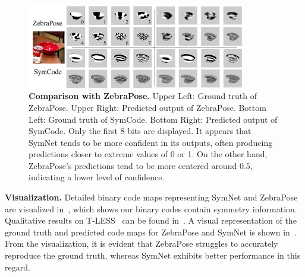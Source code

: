 \begin{figure}[th]
        \centerline{\includegraphics[width=0.85\textwidth]{figure/symnet/compare_with_zebrapose.jpg}}
        \caption{\textbf{Comparison with ZebraPose.} Upper Left: Ground truth of ZebraPose. Upper Right: Predicted output of ZebraPose. Bottom Left: Ground truth of SymCode. Bottom Right: Predicted output of SymCode. Only the first 8 bits are displayed. It appears that SymNet tends to be more confident in its outputs, often producing predictions closer to extreme values of 0 or 1. On the other hand, ZebraPose's predictions tend to be more centered around 0.5, indicating a lower level of confidence.}
        \label{fig:compare_zebrapose}
\end{figure}

\textbf{Visualization.} Detailed binary code maps representing SymNet and ZebraPose are visualized in~, which shows our binary codes contain symmetry information. Qualitative results on T-LESS~\cite{2017tless} can be found in~. A visual representation of the ground truth and predicted code maps for ZebraPose and SymNet is shown in~. From the visualization, it is evident that ZebraPose struggles to accurately reproduce the ground truth, whereas SymNet exhibits better performance in this regard.




